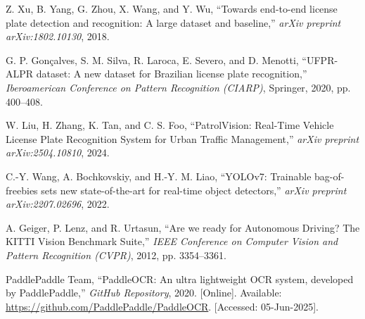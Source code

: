 \documentclass[conference]{IEEEtran}
\begin{document}
\begin{thebibliography}{99}

Z. Xu, B. Yang, G. Zhou, X. Wang, and Y. Wu,  
“Towards end-to-end license plate detection and recognition: A large dataset and baseline,”  
\textit{arXiv preprint arXiv:1802.10130}, 2018.

G. P. Gonçalves, S. M. Silva, R. Laroca, E. Severo, and D. Menotti,  
“UFPR-ALPR dataset: A new dataset for Brazilian license plate recognition,”  
\textit{Iberoamerican Conference on Pattern Recognition (CIARP)}, Springer, 2020, pp. 400--408.

W. Liu, H. Zhang, K. Tan, and C. S. Foo,  
“PatrolVision: Real-Time Vehicle License Plate Recognition System for Urban Traffic Management,”  
\textit{arXiv preprint arXiv:2504.10810}, 2024.

C.-Y. Wang, A. Bochkovskiy, and H.-Y. M. Liao,  
“YOLOv7: Trainable bag-of-freebies sets new state-of-the-art for real-time object detectors,”  
\textit{arXiv preprint arXiv:2207.02696}, 2022.

A. Geiger, P. Lenz, and R. Urtasun,  
“Are we ready for Autonomous Driving? The KITTI Vision Benchmark Suite,”  
\textit{IEEE Conference on Computer Vision and Pattern Recognition (CVPR)}, 2012, pp. 3354--3361.

PaddlePaddle Team,  
“PaddleOCR: An ultra lightweight OCR system, developed by PaddlePaddle,”  
\textit{GitHub Repository}, 2020. [Online]. Available: \url{https://github.com/PaddlePaddle/PaddleOCR}. [Accessed: 05-Jun-2025].

\end{thebibliography}
\end{document}
